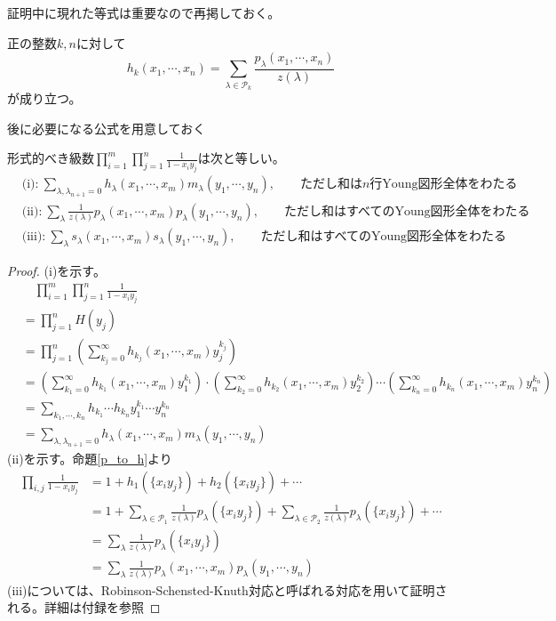 \documentclass{ltjsreport}
\begin{document}
証明中に現れた等式は重要なので再掲しておく。

\begin{prop}\label{p_to_h}
  正の整数$k,n$に対して
  \[
    h_k(x_1,\cdots,x_n)=\sum_{\lambda\in\mathcal{P}_{k}}\frac{p_\lambda(x_1,\cdots,x_n)}{z(\lambda)}
  \]
  が成り立つ。
\end{prop}

後に必要になる公式を用意しておく


\begin{lemm}[Cauchyの等式]\label{formal_power_series_relation}
  形式的べき級数$\prod_{i=1}^m\prod_{j=1}^n\frac{1}{1-x_iy_j}$は次と等しい。
  \begin{align*}
    &\text{(i):}\:\sum_{\lambda,\lambda_{n+1}=0}h_\lambda(x_1,\cdots,x_m)m_\lambda(y_1,\cdots,y_n),\qquad \text{ただし和は$n$行Young図形全体をわたる}\\
    &\text{(ii):}\:\sum_{\lambda}\frac{1}{z(\lambda)}p_\lambda(x_1,\cdots,x_m)p_\lambda(y_1,\cdots,y_n),\qquad \text{ただし和はすべてのYoung図形全体をわたる}\\
    &\text{(iii):}\:\sum_{\lambda}s_\lambda(x_1,\cdots,x_m)s_\lambda(y_1,\cdots,y_n),\qquad \text{ただし和はすべてのYoung図形全体をわたる}
  \end{align*}
\end{lemm}

\begin{proof}
  (i)を示す。
  \begin{align*}
    &\quad\prod_{i=1}^m\prod_{j=1}^n\frac{1}{1-x_iy_j}\\
    &=\prod_{j=1}^n H(y_j)\\
    &=\prod_{j=1}^n \left(
      \sum_{k_j=0}^\infty h_{k_j}(x_1,\cdots,x_m)y_j^{k_j}
      \right)\\
    &=\left(
      \sum_{k_1=0}^\infty h_{k_1}(x_1,\cdots,x_m)y_1^{k_1}
      \right)\cdot
      \left(
      \sum_{k_2=0}^\infty h_{k_2}(x_1,\cdots,x_m)y_2^{k_2}
      \right)
      \cdots
      \left(
      \sum_{k_n=0}^\infty h_{k_n}(x_1,\cdots,x_m)y_n^{k_n}
      \right)\\
    &=\sum_{k_1,\cdots,k_n}h_{k_1}\cdots h_{k_n}y_1^{k_1}  
      \cdots y_n^{k_n}\\
    &=\sum_{\lambda, \lambda_{n+1}=0}h_\lambda(x_1,\cdots,
      x_m)m_\lambda(y_1,\cdots,y_n)
  \end{align*}
  (ii)を示す。命題\ref{p_to_h}より
  \begin{align*}
  \prod_{i,j}\frac{1}{1-x_iy_j}
  &=1+h_1(\{x_iy_j\})+h_2(\{x_iy_j\})+\cdots\\
  &=1+\sum_{\lambda\in\mathcal{P}_1}\frac{1}{z(\lambda)}p_\lambda(\{x_iy_j\})+\sum_{\lambda\in\mathcal{P}_2}\frac{1}{z(\lambda)}p_\lambda(\{x_iy_j\})+\cdots\\
  &=\sum_{\lambda}\frac{1}{z(\lambda)}p_\lambda(\{x_iy_j\})\\
  &=\sum_{\lambda}\frac{1}{z(\lambda)}p_\lambda(x_1,\cdots,x_m)p_\lambda(y_1,\cdots,y_n)
  \end{align*}
  (iii)については、Robinson-Schensted-Knuth対応と呼ばれる対応を用いて証明される。詳細は付録を参照
\end{proof}
\end{document}
